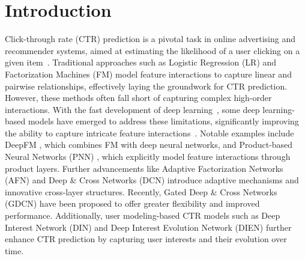 \section{Introduction}
Click-through rate (CTR) prediction is a pivotal task in online advertising and recommender systems, aimed at estimating the likelihood of a user clicking on a given item~\cite{other_18_clustering,other_16_user}. Traditional approaches such as Logistic Regression (LR) \cite{LR} %
and Factorization Machines (FM) \cite{FM}  %
model feature interactions to capture linear and pairwise relationships, effectively laying the groundwork for CTR prediction. However, these methods often fall short of capturing complex high-order interactions. With the fast development of deep learning~\cite{other_21_learning,other_22_context,other_23_graph,other_24_hierarchical,other_25_cglb,other_26_exploring,other_27_configure,other_28_lever,other_29_live}, some deep learning-based models have emerged to address these limitations, significantly improving the ability to capture intricate feature interactions~\cite{important_1_survey,important_2_perlaw,important_5_multi,other_6_breaking,other_7_bridging,other_11_exploring,other_13_efficient,other_14_mf}. Notable examples include DeepFM \cite{DeepFM}, which combines FM \cite{FM} with deep neural networks, and Product-based Neural Networks (PNN) \cite{PNN}, which explicitly model feature interactions through product layers. Further advancements like Adaptive Factorization Networks (AFN) \cite{AFN} and Deep \& Cross Networks (DCN) \cite{DeepCross} introduce adaptive mechanisms and innovative cross-layer structures. Recently, Gated Deep \& Cross Networks (GDCN) \cite{GDCN} have been proposed to offer greater flexibility and improved performance. Additionally, user modeling-based CTR models such as Deep Interest Network (DIN) \cite{DIN} and Deep Interest Evolution Network (DIEN) \cite{DIEN} further enhance CTR prediction by capturing user interests and their evolution over time.


    
    
